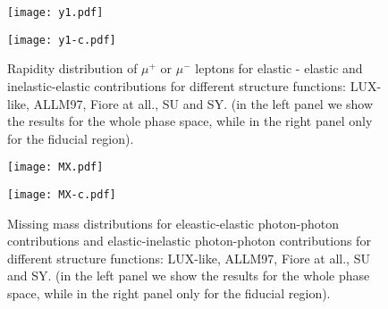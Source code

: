 \begin{figure}[!htbp]
\begin{minipage}{0.47\textwidth}
 \centerline{\texttt{[image: y1.pdf]}}
\end{minipage}
\begin{minipage}{0.47\textwidth}
 \centerline{\texttt{[image: y1-c.pdf]}}
\end{minipage}

\caption{
Rapidity distribution of $\mu^+$ or $\mu^-$ leptons
for elastic - elastic and inelastic-elastic contributions for different structure functions: LUX-like, ALLM97, Fiore at all., SU and SY. (in the left panel we show the results for the whole phase space, while in the right panel only for the fiducial region).
}
 \label{fig:dsig_dMWW_ineine}
\end{figure}




\begin{figure}[!htbp]
\begin{minipage}{0.47\textwidth}
 \centerline{\texttt{[image: MX.pdf]}}
\end{minipage}
\begin{minipage}{0.47\textwidth}
 \centerline{\texttt{[image: MX-c.pdf]}}
\end{minipage}
\caption{
Missing mass distributions for eleastic-elastic photon-photon contributions and elastic-inelastic photon-photon contributions for different structure functions: LUX-like, ALLM97, Fiore at all., SU and SY. (in the left panel we show the results for the whole phase space, while in the right panel only for the fiducial region).
}
\label{fig:dsig_dy}
\end{figure}




